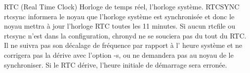 \documentclass[a4paper]{article}
\begin{document}
\begin{adjustwidth}{-2cm}{-2cm}
RTC (Real Time Clock)\newline
Horloge de temps réel, l’horloge système.\newline
\newpage
RTCSYNC\newline
rtcsync informera le noyau que l'horloge système est synchronisée et donc le noyau mettra à jour l'horloge RTC toutes les 11 minutes.
Si aucun rtcfile ou rtcsync n'est dans la configuration, chronyd ne se souciera pas
du tout du RTC. Il ne suivra pas son décalage de fréquence par rapport à l'
heure système et ne corrigera pas la dérive avec l'option -s, ou ne demandera pas au
noyau de le synchroniser. Si le RTC dérive, l'heure initiale de démarrage
sera erronée.

\end{adjustwidth}
\end{document}
